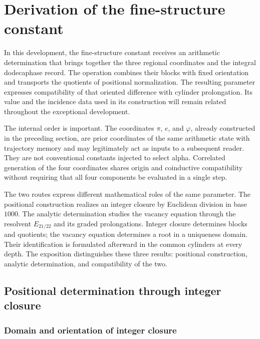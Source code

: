 \section{Derivation of the fine-structure constant}
\label{sec:alpha}

In this development, the fine-structure constant receives an arithmetic
determination that brings together the three regional coordinates and the integral
dodecaphase record. The operation combines their blocks with fixed orientation and
transports the quotients of positional normalization. The resulting
parameter expresses compatibility of that oriented difference with
cylinder prolongation. Its value and the incidence data
used in its construction will remain related throughout the
exceptional development.

The internal order is important. The coordinates \(\pi\),
\(e\), and \(\varphi\), already constructed in the preceding section, are prior
coordinates of the same arithmetic state with trajectory memory and may legitimately act as
inputs to a subsequent reader. They are not conventional constants
injected to select alpha. Correlated generation of the four coordinates shares origin and
coinductive compatibility without requiring that all four
components be evaluated in a single step.

The two routes express different mathematical roles of the same parameter.
The positional construction realizes an integer closure by Euclidean division in base
\(1000\). The analytic determination studies the vacancy equation through
the resolvent \(E_{21/22}\) and its graded prolongations. Integer closure
determines blocks and quotients; the vacancy equation determines a root in a
uniqueness domain. Their identification is formulated afterward
in the common cylinders at every depth. The exposition distinguishes
these three results: positional construction, analytic determination,
and compatibility of the two.

\subsection{Positional determination through integer closure}
\subsubsection{Domain and orientation of integer closure}
\label{subsec:alpha-dominio}

